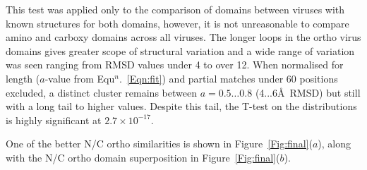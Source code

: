 \documentclass[12pt]{article}
\newcommand{\Eqn}[1]{Equ$^n$.~\ref{Eqn:#1}}
\newcommand{\Fig}[1]{Figure~\ref{Fig:#1}}
\newcommand{\3}{$3_{10}$}
\begin{document}
This test was applied only to the comparison of domains between viruses with 
known structures for both domains, however, it is not unreasonable to compare
amino and carboxy domains across all viruses.  The longer loops in the ortho virus
domains gives greater scope of structural variation and a wide range of variation
was seen ranging from RMSD values under 4 to over 12.  
When normalised for length ($a$-value from \Eqn{fit}) and partial matches under
60 positions excluded, a distinct cluster remains between $a=0.5\ldots0.8$ (4...6\AA\ 
RMSD) but still with a long tail to higher values.
Despite this tail, the T-test on the distributions is highly significant at $2.7 \times 10^{-17}$.

One of the better N/C ortho similarities is shown in \Fig{final}($a$), along with the
N/C ortho domain superposition in \Fig{final}($b$).
%
%
%
%
%
%
 
\end{document}
